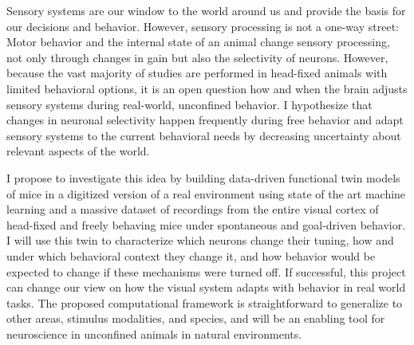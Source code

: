 Sensory systems are our window to the world around us and provide the basis for our decisions and behavior. 
However, sensory processing is not a one-way street:
Motor behavior and the internal state of an animal change sensory processing, not only through changes in gain but also the selectivity of neurons. 
However, because the vast majority of studies are performed in head-fixed animals with limited behavioral options, it is an open question how and when the brain adjusts sensory systems during real-world, unconfined behavior. 
I hypothesize that changes in neuronal selectivity happen frequently during free behavior and adapt sensory systems to the current behavioral needs by decreasing uncertainty about relevant aspects of the world.

I propose to investigate this idea by building data-driven functional twin models of mice in a digitized version of a real environment using state of the art machine learning and a massive dataset of recordings from the entire visual cortex of head-fixed and freely behaving mice under spontaneous and goal-driven behavior.
I will use this twin to characterize which neurons change their tuning, how and under which behavioral context they change it, and how behavior would be expected to change if these mechanisms were turned off.
If successful, this project can change our view on how the visual system adapts with behavior in real world tasks. 
The proposed computational framework is straightforward to generalize to other areas, stimulus modalities, and species, and will be an enabling tool for neuroscience in unconfined animals in natural environments.
